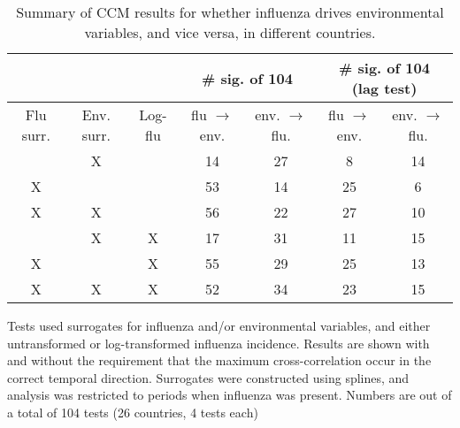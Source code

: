 \documentclass[11pt]{article}
\begin{document}
\begin{table}
\centering
\caption{
    \label{tab:byvariant}
    Summary of CCM results for whether influenza drives environmental variables, and vice versa, in different countries.
}
\begin{tabularx}{\textwidth}{ c | c | c | c | c | c | c}
\multicolumn{3}{c}{} & \multicolumn{2}{c}{\# sig. of 104} & \multicolumn{2}{c}{\# sig. of 104 (lag test)} \\
\hline
Flu surr. & Env. surr. & Log-flu & flu $\rightarrow$ env. & env. $\rightarrow$ flu. & flu $\rightarrow$ env. & env. $\rightarrow$ flu. \\
\hline
& X &  & 14 & 27 & 8 & 14 \\
X &  &  & 53 & 14 & 25 & 6 \\
X & X &  & 56 & 22 & 27 & 10 \\
& X & X & 17 & 31 & 11 & 15 \\
X &  & X & 55 & 29 & 25 & 13 \\
X & X & X & 52 & 34 & 23 & 15 \\
\end{tabularx}
\end{table}

\noindent Tests used surrogates for influenza and/or environmental variables,
and either untransformed or log-transformed influenza incidence.
Results are shown with and without the requirement that the maximum cross-correlation occur in the correct temporal direction.
Surrogates were constructed using splines, and analysis was restricted to periods when influenza was present.
Numbers are out of a total of 104 tests (26 countries, 4 tests each)
\end{document}
